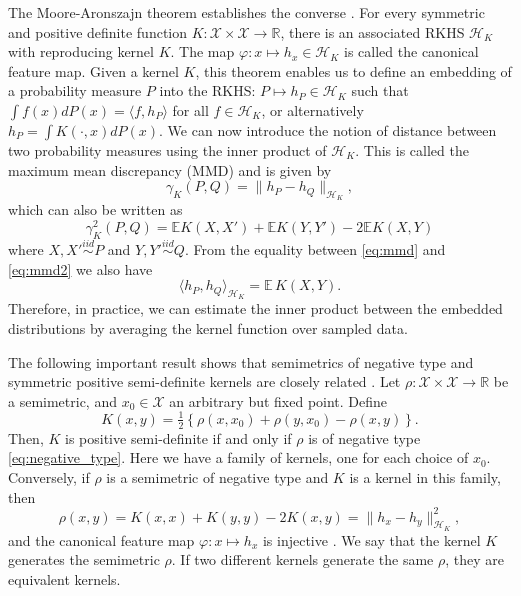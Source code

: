 \documentclass{article}
\newcommand\E{\mathbb{E}}
\newcommand\kk{K}
\newcommand\kkk{h}
\newcommand\Hk{{\mathcal{H}}_{\kk}}
\begin{document}
The Moore-Aronszajn theorem establishes the converse \cite{Aronszajn}.
For every symmetric
and positive definite function $\kk: \mathcal{X}\times \mathcal{X} \to
\mathbb{R}$, there is an associated RKHS $\Hk$ 
with reproducing
kernel $\kk$. The map $\varphi: x \mapsto \kkk_x \in \Hk$ is called
the canonical feature map. Given a kernel $\kk$,
this theorem enables us to define an embedding of a probability measure
$P$ into the RKHS: $P \mapsto \kkk_P \in
\Hk$ such that 
$\int f(x) d P(x) = \langle f, \kkk_P \rangle$ for all $f \in \Hk$,
or alternatively $\kkk_P = \int \kk(\cdot, x)  d P(x)$. 
We can now  introduce the 
notion of distance between two probability measures using the inner product
of $\Hk$. This is called the maximum mean discrepancy (MMD) and
is given by
\begin{equation}\label{eq:mmd}
\gamma_\kk(P,Q) = \| \kkk_P - \kkk_Q \|_{\Hk},
\end{equation}
which can also be written as \cite{Gretton2012}
\begin{equation}\label{eq:mmd2}
\gamma_\kk^2(P,Q) = \E \kk(X,X') + \E \kk(Y,Y') - 2 \E \kk(X, Y)
\end{equation}
where $X,X' \stackrel{iid}{\sim} P$ and $Y,Y'\stackrel{iid}{\sim} Q$.
From the equality between \eqref{eq:mmd} and \eqref{eq:mmd2} we also
have 
\begin{equation}\label{eq:inner_data}
\langle \kkk_P, \kkk_Q \rangle_{\Hk} = \E \, \kk(X, Y).
\end{equation}
Therefore, in practice, we can estimate the inner product between the 
embedded distributions 
by averaging the kernel function over sampled data.

The following important result shows that semimetrics of negative
type and symmetric positive semi-definite kernels are closely related
\cite{Berg1984}. Let $\rho: \mathcal{X} \times \mathcal{X} \to \mathbb{R}$
be a semimetric, 
and $x_0 \in \mathcal{X}$ an arbitrary but fixed point.
Define
\begin{equation}
\label{eq:kernel_semimetric}
\kk(x,y) = \tfrac{1}{2} \left\{  \rho(x,x_0) + \rho(y,x_0) - \rho(x,y)\right\}.
\end{equation}
Then, $\kk$ is positive semi-definite if and only if $\rho$ is of negative type
\eqref{eq:negative_type}.
Here we have a family of kernels, one for each choice of $x_0$. Conversely,
if $\rho$ is a semimetric of negative type and $\kk$ is a kernel in this
family, then 
\begin{equation}
\label{eq:gen_kernel}
\rho(x,y) = \kk(x,x) + \kk(y,y) -2\kk(x,y) = \| \kkk_x - \kkk_y
\|^2_{\Hk},
\end{equation}
and the canonical feature map 
$\varphi: x \mapsto \kkk_x$ is injective \cite{Sejdinovic2013}.
We say that the kernel $\kk$ generates the semimetric $\rho$. 
If two different kernels generate the same $\rho$, they are
equivalent kernels.
\end{document}

